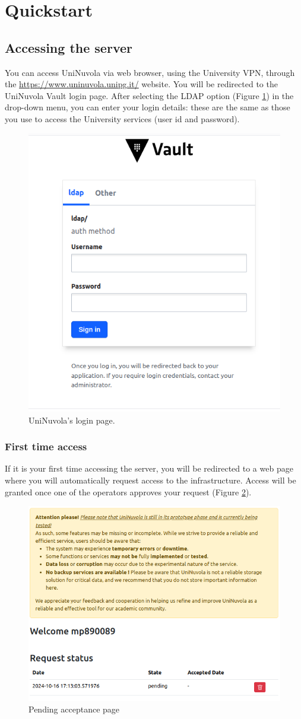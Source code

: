 \section{Quickstart}

\subsection{Accessing the server}

You can access UniNuvola via web browser, using the University VPN, through the
\href{https://www.uninuvola.unipg.it/}{https://www.uninuvola.unipg.it/} website. You will be redirected to the UniNuvola
Vault login page. After selecting the LDAP option (Figure \ref{fig:login}) in the drop-down menu, you can enter your
login details: these are the same as those you use to access the University services (user id and password).

\begin{figure}[!ht]
    \centering
    \includegraphics[width=0.5\linewidth]{img/login_page.png}
    \caption{UniNuvola's login page.}
    \label{fig:login}
\end{figure}

\subsubsection{First time access }
If it is your first time accessing the server, you will be redirected to a web page  where you will automatically request access to the infrastructure. Access will be granted once one of the operators approves your request (Figure
\ref{fig:pending}).
\begin{figure}[!ht]
    \centering
    \includegraphics[width=0.5\linewidth]{img/request_page.png}
    \caption{Pending acceptance page}
    \label{fig:pending}
\end{figure}

